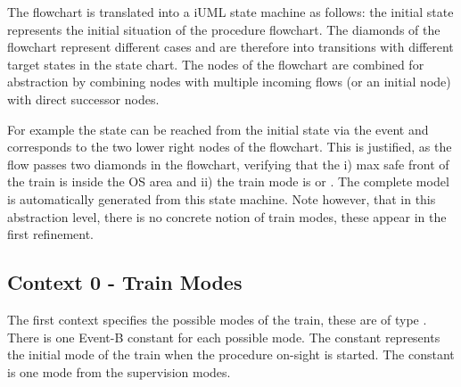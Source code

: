\documentclass{template/openetcs_article}
\begin{document}
The flowchart is translated into a iUML state machine as follows: the initial
state represents the initial situation of the procedure flowchart. The diamonds
of the flowchart represent different cases and are therefore into transitions
with different target states in the state chart. The nodes of the flowchart are
combined for abstraction by combining nodes with multiple incoming flows (or an
initial node) with direct successor nodes.

For example the state  can be reached from the
initial state via the event
 and corresponds to the two
lower right nodes of the flowchart. This is justified, as the flow passes two
diamonds in the flowchart, verifying that the i) max safe front of the train is
inside the OS area and ii) the train mode is  or . The
complete model is automatically generated from this state machine. Note
however, that in this abstraction level, there is no concrete notion of train
modes, these appear in the first refinement.


\subsection{Context 0 - Train Modes}
\label{sec:context-0-entities}

The first context  specifies the possible modes of the train, these are
of type . There is one Event-B constant for each possible
mode. The constant  represents the initial mode of the
train when the procedure on-sight is started. The constant
 is one mode from the supervision modes.







\end{document}

